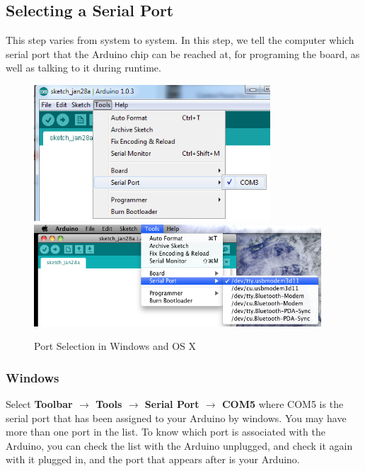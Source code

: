 \documentclass[11pt,a4paper]{article}
\begin{document}

\subsection{Selecting a Serial Port} %

\label{sub:selecting_a_serial_port}
This step varies from system to system.  In this step, we tell the computer which serial port that the Arduino chip can be reached at, for programing the board, as well as talking to it during runtime.
    \begin{figure}[htbp]
        \centering
            \includegraphics[height=2in]{figures/port-windows.png}
            \includegraphics[height=1.5in]{figures/port-osx.png}
        \caption{Port Selection in Windows and OS X}
        \label{fig:figures_port}
    \end{figure}

\subsubsection{Windows} %

\label{ssub:windows}
Select \textbf{Toolbar $\rightarrow$ Tools $\rightarrow$ Serial Port $\rightarrow$ COM5} where COM5 is the serial port that has been assigned to your Arduino by windows.  You may have more than one port in the list.  To know which port is associated with the Arduino, you can check the list with the Arduino unplugged, and check it again with it plugged in, and the port that appears after is your Arduino.

\end{document}
